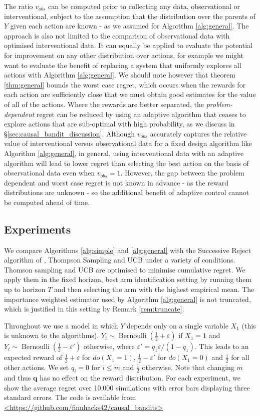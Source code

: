 \documentclass[11pt,a4paper,twoside]{report}
\newcommand{\bernoulli}{\operatorname{Bernoulli}}
\theoremstyle{plain}
\theoremstyle{definition}
\let\epsilon\varepsilon
\begin{document}
The ratio $v_{obs}$ can be computed prior to collecting any data, observational or interventional, subject to the assumption that the distribution over the parents of $Y$ given each action are known - as we assumed for Algorithm \ref{alg:general}. The approach is also not limited to the comparison of observational data with optimised interventional data. It can equally be applied to evaluate the potential for improvement on any other distribution over actions, for example we might want to evaluate the benefit of replacing a system that uniformly explores all actions with Algorithm \ref{alg:general}. We should note however that theorem \ref{thm:general} bounds the worst case regret, which occurs when the rewards for each action are sufficiently close that we must obtain good estimates for the value of all of the actions. Where the rewards are better separated, the \emph{problem-dependent} regret can be reduced by using an adaptive algorithm that ceases to explore actions that are sub-optimal with high probability, as we discuss in \S\ref{sec:causal_bandit_discussion}. Although $v_{obs}$ accurately captures the relative value of interventional versus observational data for a fixed design algorithm like Algorithm \ref{alg:general}, in general, using interventional data with an adaptive algorithm will lead to lower regret than selecting the best action on the basis of observational data even when $v_{obs} = 1$. However, the gap between the problem dependent and worst case regret is not known in advance - as the reward distributions are unknown - so the additional benefit of adaptive control cannot be computed ahead of time.

\subsection{Experiments}
\label{sec:causal-bandit-experiments}
We compare Algorithms \ref{alg:simple} and \ref{alg:general} with the Successive Reject algorithm of \citet{Audibert2010}, Thompson Sampling and UCB under a variety of conditions. Thomson sampling and UCB are optimised to minimise cumulative regret. We apply them in the fixed horizon, best arm identification setting by running them up to horizon $T$ and then selecting the arm with the highest empirical mean. The importance weighted estimator used by Algorithm \ref{alg:general} is not truncated, which is justified in this setting by Remark \ref{rem:truncate}. 

Throughout we use a model in which $Y$ depends only on a single variable $X_1$ (this is unknown to the algorithms). $Y_t \sim \bernoulli(\frac{1}{2}+\epsilon)$ if $X_1=1$ and $Y_t \sim \bernoulli(\frac{1}{2}-\epsilon')$ otherwise, where $\epsilon' = q_1\epsilon/(1-q_1)$. This leads to an expected reward of $\frac{1}{2}+\epsilon$ for $do(X_1=1)$, $\frac{1}{2}-\epsilon'$ for $do(X_1=0)$ and $\frac{1}{2}$ for all other actions. We set $q_i = 0$ for $i \leq m$ and $\frac{1}{2}$ otherwise. Note that changing $m$ and thus $\boldsymbol{q}$ has no effect on the reward distribution. For each experiment, we show the average regret over 10,000 simulations with error bars displaying three standard errors. The code is available from \url{<https://github.com/finnhacks42/causal_bandits>} 
\end{document}
